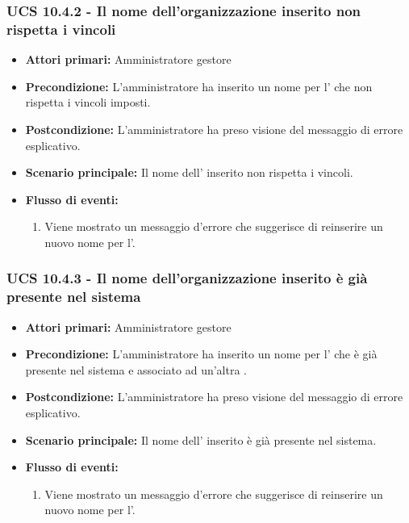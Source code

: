 \subsubsection{UCS 10.4.2 - Il nome dell'organizzazione inserito non rispetta i vincoli}%
\begin{itemize}
\item \textbf{Attori primari:} Amministratore gestore
\item \textbf{Precondizione:} L'amministratore ha inserito un nome per l' che non rispetta i vincoli imposti.
\item \textbf{Postcondizione:} L'amministratore ha preso visione del messaggio di errore esplicativo.
\item \textbf{Scenario principale:} Il nome dell' inserito non rispetta i vincoli.
\item \textbf{Flusso di eventi:}
    \begin{enumerate}
    \item Viene mostrato un messaggio d'errore che suggerisce di reinserire un nuovo nome per l'.
    \end{enumerate} 
\end{itemize}

\subsubsection{UCS 10.4.3 - Il nome dell'organizzazione inserito è già presente nel sistema}%
\begin{itemize}
\item \textbf{Attori primari:} Amministratore gestore
\item \textbf{Precondizione:} L'amministratore ha inserito un nome per l' che è già presente nel sistema e associato ad un'altra .
\item \textbf{Postcondizione:} L'amministratore ha preso visione del messaggio di errore esplicativo.
\item \textbf{Scenario principale:} Il nome dell' inserito è già presente nel sistema.
\item \textbf{Flusso di eventi:}
    \begin{enumerate}
    \item Viene mostrato un messaggio d'errore che suggerisce di reinserire un nuovo nome per l'.
    \end{enumerate} 
\end{itemize}

